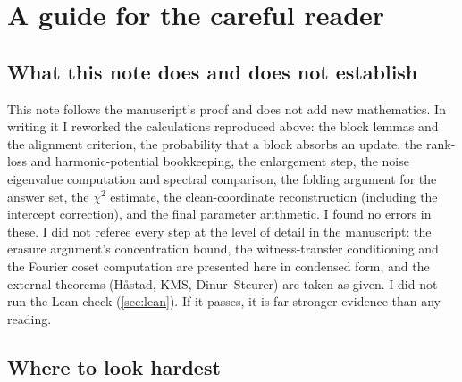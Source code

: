 \documentclass[11pt]{article}
\theoremstyle{definition}
\theoremstyle{remark}
\begin{document}
\section{A guide for the careful reader}\label{sec:reader}

\subsection{What this note does and does not establish}

This note follows the manuscript's proof and does not add new mathematics. In
writing it I reworked the calculations reproduced above: the block lemmas and
the alignment criterion, the probability that a block absorbs an update, the
rank-loss and harmonic-potential bookkeeping, the enlargement step, the noise
eigenvalue computation and spectral comparison, the folding argument for the
answer set, the $\chi^2$ estimate, the clean-coordinate reconstruction
(including the intercept correction), and the final parameter arithmetic. I
found no errors in these. I did not referee every step at the level of detail
in the manuscript: the erasure argument's concentration bound, the
witness-transfer conditioning and the Fourier coset computation are presented
here in condensed form, and the external theorems (H{\aa}stad, KMS, Dinur--Steurer)
are taken as given. I did not run the Lean check (\cref{sec:lean}). If it
passes, it is far stronger evidence than any reading.

\subsection{Where to look hardest}
\end{document}
